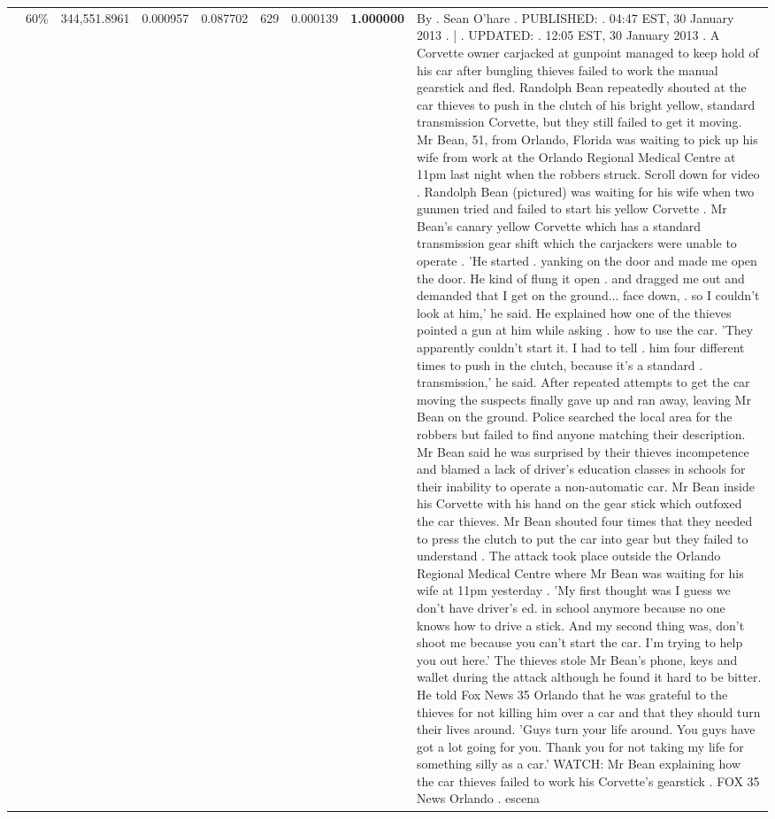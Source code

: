 \begin{table}[H]
\begin{tabular}{llrrrrrrl}
 & 60\% & 344,551.8961 & 0.000957 & 0.087702 & \color{red} 629 & 0.000139 & \bfseries \color{red} 1.000000 & By . Sean O'hare . PUBLISHED: . 04:47 EST, 30 January 2013 . | . UPDATED: . 12:05 EST, 30 January 2013 . A Corvette owner carjacked at gunpoint managed to keep hold of his car after bungling thieves failed to work the manual gearstick and fled. Randolph Bean repeatedly shouted at the car thieves to push in the clutch of his bright yellow, standard transmission Corvette, but they still failed to get it moving. Mr Bean, 51, from Orlando, Florida was waiting to pick up his wife from work at the Orlando Regional Medical Centre at 11pm last night when the robbers struck. Scroll down for video . Randolph Bean (pictured) was waiting for his wife when two gunmen tried and failed to start his yellow Corvette . Mr Bean's canary yellow Corvette which has a standard transmission gear shift which the carjackers were unable to operate . 'He started . yanking on the door and made me open the door. He kind of flung it open . and dragged me out and demanded that I get on the ground... face down, . so I couldn't look at him,' he said. He explained how one of the thieves pointed a gun at him while asking . how to use the car. 'They apparently couldn't start it. I had to tell . him four different times to push in the clutch, because it's a standard . transmission,' he said. After repeated attempts to get the car moving the suspects finally gave up and ran away, leaving Mr Bean on the ground. Police searched the local area for the robbers but failed to find anyone matching their description. Mr Bean said he was surprised by their thieves incompetence and blamed a lack of driver's education classes in schools for their inability to operate a non-automatic car. Mr Bean inside his Corvette with his hand on the gear stick which outfoxed the car thieves. Mr Bean shouted four times that they needed to press the clutch to put the car into gear but they failed to understand . The attack took place outside the Orlando Regional Medical Centre where Mr Bean was waiting for his wife at 11pm yesterday . 'My first thought was I guess we don't have driver's ed. in school anymore because no one knows how to drive a stick. And my second thing was, don't shoot me because you can't start the car. I'm trying to help you out here.' The thieves stole Mr Bean's phone, keys and wallet during the attack although he found it hard to be bitter. He told Fox News 35 Orlando that he was grateful to the thieves for not killing him over a car and that they should turn their lives around. 'Guys turn your life around. You guys have got a lot going for you. Thank you for not taking my life for something silly as a car.' WATCH: Mr Bean explaining how the car thieves failed to work his Corvette's gearstick . FOX 35 News Orlando . escena \\

\end{tabular}
\end{table}

